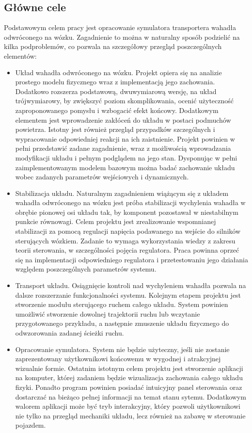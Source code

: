 \documentclass[12pt, oneside]{report}
\theoremstyle{definition}
\begin{document}
\subsection{Główne cele}
Podstawowym celem pracy jest opracowanie symulatora transportera wahadła odwróconego na wózku. Zagadnienie to można w naturalny sposób podzielić na kilka podproblemów, co pozwala na szczegółowy przegląd poszczególnych elementów:
\begin{itemize}
\item Układ wahadła odwróconego na wózku. Projekt opiera się na analizie prostego modelu fizycznego wraz z implementacją jego zachowania. Dodatkowo rozszerza podstawową, dwuwymiarową wersję, na układ trójwymiarowy, by zwiększyć poziom skomplikowania, ocenić użyteczność zaproponowanego pomysłu i wzbogacić efekt końcowy. Dodatkowym elementem jest wprowadzenie zakłóceń do układu w postaci podmuchów powietrza. Istotny jest również przegląd przypadków szczególnych i wypracowanie odpowiedniej reakcji na ich zaistnienie. Projekt powinien w pełni przedstawić zadane zagadnienie, wraz z możliwością wprowadzania modyfikacji układu i pełnym podglądem na jego stan. Dysponując w pełni zaimplementowanym modelem bazowym można badać zachowanie układu wobec zadanych parametrów wejściowych i dynamicznych.
\item Stabilizacja układu. Naturalnym zagadnieniem wiążącym się z układem wahadła odwróconego na wózku jest próba stabilizacji wychylenia wahadła w obrębie pionowej osi układu tak, by komponent pozostawał w niestabilnym punkcie równowagi. Celem projektu jest zrealizowanie wspomnianej stabilizacji za pomocą regulacji napięcia podawanego na wejście do silników sterujących wózkiem. Zadanie to wymaga wykorzystania wiedzy z zakresu teorii sterowania, w szczególności pojęcia regulatora. Praca powinna oprzeć się na implementacji odpowiedniego regulatora i przetestowaniu jego działania względem poszczególnych parametrów systemu. 
\item Transport układu. Osiągnięcie kontroli nad wychyleniem wahadła pozwala na dalsze rozszerzanie funkcjonalności systemu. Kolejnym etapem projektu jest stworzenie modułu sterującego ruchem całego układu. System powinien umożliwić stworzenie dowolnej trajektorii ruchu lub wczytanie przygotowanego przykładu, a następnie zmuszenie układu fizycznego do odwzorowania zadanej ścieżki ruchu.
\item Opracowanie symulatora. System nie będzie użyteczny, jeśli nie zostanie zaprezentowany użytkownikowi końcowemu w wygodnej i atrakcyjnej wizualnie formie. Ostatnim istotnym celem projektu jest stworzenie aplikacji na komputer, której zadaniem będzie wizualizacja zachowania całego układu fizyki. Ponadto program powinien posiadać intuicyjny panel sterowania oraz dostarczać na bieżąco pełnej informacji na temat stanu sytemu. Dodatkowym walorem aplikacji może być tryb interakcyjny, który pozwoli użytkownikowi nie tylko na przegląd mechaniki układu, lecz również na zabawę w sterowanie pojazdem.
\end{itemize}
\end{document}
